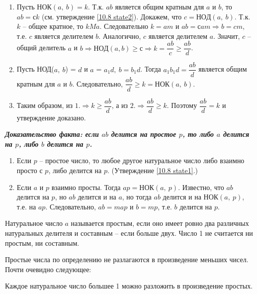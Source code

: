 \begin{enumerate}[itemsep=0.05em]
    \item Пусть $НОК(a,~b) = k$. Т.к. $ab$ является общим кратным для $a$ и $b$, то $ab = сk$ (см. утверждение \ref{10.8 state2}). Докажем, что $c = НОД(a,~b)$. Т.к. $k$ -- общее кратное, то $k M a$. Следовательно $k = am$ и $ab = сam \Rightarrow b = cm$, т.е. $c$ является делителем $b$. Аналогично, $c$ является делителем $a$. Значит, $c$ -- общий делитель $a$ и $b \Rightarrow НОД(a, b) \geq с \Rightarrow k = \dfrac{ab}{c} \geq \dfrac{ab}{d}$.
    
    \item Пусть НОД($a,~b$) = $d$ и $a$ = $a_1d,~b = b_1d$. Тогда $a_1b_1d = \dfrac{ab}{d}$ является общим кратным для $a$ и $b$. Следовательно, $\dfrac{ab}{d} \geq k = НОК(a,~b)$.
    
    \item Таким образом, из $1. \Rightarrow  k \geq \dfrac{ab}{d}$, а из $2. \Rightarrow \dfrac{ab}{d} \geq k$. Поэтому $\dfrac{ab}{d} = k$ и утверждение доказано. \hfill \qedsymbol
\end{enumerate}

\newpage

\textbf{\textit{Доказательство факта: если $ab$ делится на простое $p$, то либо $a$ делится на $p$, либо $b$ делится на $p$.}}

\begin{enumerate}[itemsep=0.05em]
    \item Если $p$ -- простое число, то любое другое натуральное число либо взаимно просто с $p$, либо делится на $p$. (Утверждение \ref{10.8 state1}.)

    \item Если $a$ и $p$ взаимно просты. Тогда $ap = НОК(a,~p)$. Известно, что $ab$ делится на $p$, но $ab$ делится и на $a$, но тогда $ab$ делится и на $НОК(a,~p)$, т.е. на $ap$. Следовательно, $ab = map$ и $b = mp$, т.е. $b$ делится на $p$. \hfill \qedsymbol
\end{enumerate}

\begin{dfn}
    Натуральное число $a$ называется простым, если оно имеет ровно два различных натуральных делителя и составным -- если больше двух. Число 1 не считается ни простым, ни составным.
\end{dfn}

\noindent Простые числа по определению не разлагаются в произведение меньших чисел. Почти очевидно следующее:

\begin{dfn}
    Каждое натуральное число большее 1 можно разложить в произведение простых.
\end{dfn}

